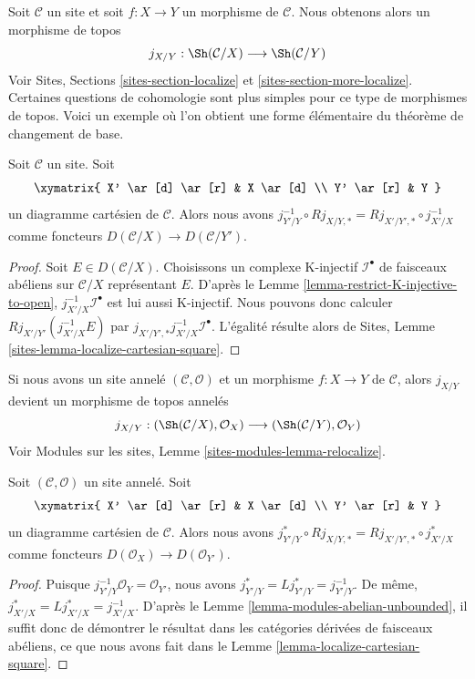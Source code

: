 \noindent
Soit $\mathcal{C}$ un site et soit $f : X \to Y$ un morphisme de
$\mathcal{C}$. Nous obtenons alors un morphisme de topos
$$
j_{X/Y} : \Sh(\mathcal{C}/X) \longrightarrow \Sh(\mathcal{C}/Y)
$$
Voir Sites, Sections \ref{sites-section-localize} et
\ref{sites-section-more-localize}. Certaines questions de cohomologie sont
plus simples pour ce type de morphismes de topos. Voici un exemple où l'on
obtient une forme élémentaire du théorème de changement de base.

\begin{lemma}
\label{lemma-localize-cartesian-square}
Soit $\mathcal{C}$ un site. Soit
$$
\xymatrix{
X' \ar[d] \ar[r] & X \ar[d] \\
Y' \ar[r] & Y
}
$$
un diagramme cartésien de $\mathcal{C}$. Alors nous avons
$j_{Y'/Y}^{-1} \circ Rj_{X/Y, *} = Rj_{X'/Y', *} \circ j_{X'/X}^{-1}$
comme foncteurs $D(\mathcal{C}/X) \to D(\mathcal{C}/Y')$.
\end{lemma}

\begin{proof}
Soit $E \in D(\mathcal{C}/X)$. Choisissons un complexe K-injectif
$\mathcal{I}^\bullet$ de faisceaux abéliens sur $\mathcal{C}/X$
représentant $E$. D'après le Lemme
\ref{lemma-restrict-K-injective-to-open},
$j_{X'/X}^{-1}\mathcal{I}^\bullet$ est lui aussi K-injectif. Nous pouvons
donc calculer $Rj_{X'/Y'}(j_{X'/X}^{-1}E)$ par
$j_{X'/Y', *}j_{X'/X}^{-1}\mathcal{I}^\bullet$. L'égalité résulte alors de
Sites, Lemme \ref{sites-lemma-localize-cartesian-square}.
\end{proof}

\noindent
Si nous avons un site annelé $(\mathcal{C}, \mathcal{O})$ et un morphisme
$f : X \to Y$ de $\mathcal{C}$, alors $j_{X/Y}$ devient un morphisme de
topos annelés
$$
j_{X/Y} :
(\Sh(\mathcal{C}/X), \mathcal{O}_X)
\longrightarrow
(\Sh(\mathcal{C}/Y), \mathcal{O}_Y)
$$
Voir Modules sur les sites, Lemme
\ref{sites-modules-lemma-relocalize}.

\begin{lemma}
\label{lemma-localize-cartesian-square-modules}
Soit $(\mathcal{C}, \mathcal{O})$ un site annelé. Soit
$$
\xymatrix{
X' \ar[d] \ar[r] & X \ar[d] \\
Y' \ar[r] & Y
}
$$
un diagramme cartésien de $\mathcal{C}$. Alors nous avons
$j_{Y'/Y}^* \circ Rj_{X/Y, *} = Rj_{X'/Y', *} \circ j_{X'/X}^*$
comme foncteurs
$D(\mathcal{O}_X) \to D(\mathcal{O}_{Y'})$.
\end{lemma}

\begin{proof}
Puisque $j_{Y'/Y}^{-1}\mathcal{O}_Y = \mathcal{O}_{Y'}$, nous avons
$j_{Y'/Y}^* = Lj_{Y'/Y}^* = j_{Y'/Y}^{-1}$. De même,
$j_{X'/X}^* = Lj_{X'/X}^* = j_{X'/X}^{-1}$. D'après le Lemme
\ref{lemma-modules-abelian-unbounded}, il suffit donc de démontrer le
résultat dans les catégories dérivées de faisceaux abéliens, ce que nous
avons fait dans le Lemme \ref{lemma-localize-cartesian-square}.
\end{proof}












